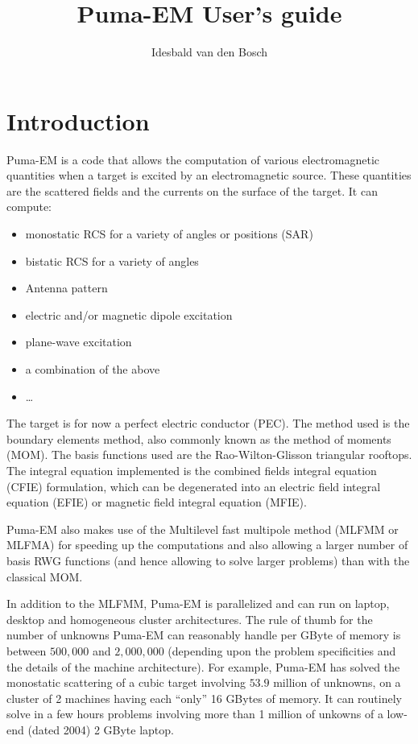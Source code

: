 \documentclass[a4paper,10pt]{book}
\title{Puma-EM User's guide}
\author{Idesbald van den Bosch}
\begin{document}
\maketitle
\tableofcontents


\chapter{Introduction}
%
\par
Puma-EM is a code that allows the computation of various electromagnetic quantities when a target is excited by an electromagnetic source. These quantities are the scattered fields and the currents on the surface of the target. It can compute:
\begin{itemize}
\item monostatic RCS for a variety of angles or positions (SAR)
\item bistatic RCS for a variety of angles
\item Antenna pattern
\item electric and/or magnetic dipole excitation
\item plane-wave excitation
\item a combination of the above
\item \ldots
\end{itemize}
%
\par
The target is for now a perfect electric conductor (PEC). The method used is the boundary elements method, also commonly known as the method of moments (MOM). The basis functions used are the Rao-Wilton-Glisson triangular rooftops. The integral equation implemented is the combined fields integral equation (CFIE) formulation, which can be degenerated into an electric field integral equation (EFIE) or magnetic field integral equation (MFIE). 
%
\par
Puma-EM also makes use of the Multilevel fast multipole method (MLFMM or MLFMA) for speeding up the computations and also allowing a larger number of basis RWG functions (and hence allowing to solve larger problems) than with the classical MOM. 
%
\par
In addition to the MLFMM, Puma-EM is parallelized and can run on laptop, desktop and homogeneous cluster architectures. The rule of thumb for the number of unknowns Puma-EM can reasonably handle per GByte of memory is between $500,000$ and $2,000,000$ (depending upon the problem specificities and the details of the machine architecture). For example, Puma-EM has solved the monostatic scattering of a cubic target involving $53.9$ million of unknowns, on a cluster of 2 machines having each ``only'' 16 GBytes of memory. It can routinely solve in a few hours problems involving more than 1 million of unkowns of a low-end (dated 2004) 2 GByte laptop.
\end{document}
